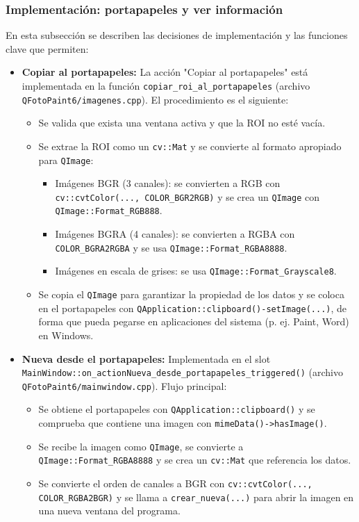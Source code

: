 \subsubsection{Implementación: portapapeles y ver información}

En esta subsección se describen las decisiones de implementación y las funciones clave que permiten:

\begin{itemize}
	\item \textbf{Copiar al portapapeles:} La acción "Copiar al portapapeles" está implementada en la función \texttt{copiar\_roi\_al\_portapapeles} (archivo \texttt{QFotoPaint6/imagenes.cpp}). El procedimiento es el siguiente:
	\begin{itemize}
		\item Se valida que exista una ventana activa y que la ROI no esté vacía.
		\item Se extrae la ROI como un \texttt{cv::Mat} y se convierte al formato apropiado para \texttt{QImage}:
		\begin{itemize}
			\item Imágenes BGR (3 canales): se convierten a RGB con \texttt{cv::cvtColor(..., COLOR\_BGR2RGB)} y se crea un \texttt{QImage} con \texttt{QImage::Format\_RGB888}.
			\item Imágenes BGRA (4 canales): se convierten a RGBA con \texttt{COLOR\_BGRA2RGBA} y se usa \texttt{QImage::Format\_RGBA8888}.
			\item Imágenes en escala de grises: se usa \texttt{QImage::Format\_Grayscale8}.
		\end{itemize}
		\item Se copia el \texttt{QImage} para garantizar la propiedad de los datos y se coloca en el portapapeles con \texttt{QApplication::clipboard()-\>setImage(...)}, de forma que pueda pegarse en aplicaciones del sistema (p. ej. Paint, Word) en Windows.
	\end{itemize}

	\item \textbf{Nueva desde el portapapeles:} Implementada en el slot \texttt{MainWindow::on\_actionNueva\_desde\_portapapeles\_triggered()} (archivo \texttt{QFotoPaint6/mainwindow.cpp}). Flujo principal:
	\begin{itemize}
		\item Se obtiene el portapapeles con \texttt{QApplication::clipboard()} y se comprueba que contiene una imagen con \texttt{mimeData()->hasImage()}.
		\item Se recibe la imagen como \texttt{QImage}, se convierte a \texttt{QImage::Format\_RGBA8888} y se crea un \texttt{cv::Mat} que referencia los datos.
		\item Se convierte el orden de canales a BGR con \texttt{cv::cvtColor(..., COLOR\_RGBA2BGR)} y se llama a \texttt{crear\_nueva(...)} para abrir la imagen en una nueva ventana del programa.
	\end{itemize}


\end{itemize}

